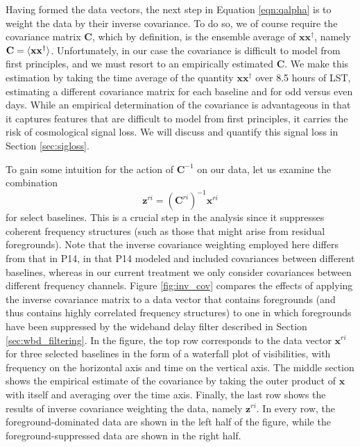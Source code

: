 \documentclass[twocolumn,numberedappendix]{emulateapj} \shorttitle{PSA64}
\newcommand{\x}{\mathbf{x}} \newcommand{\xhat}{\hat{\mathbf{x}}}
\begin{document}
Having formed the data vectors, the next step in Equation \eqref{eqn:qalpha} is to
weight the data by their inverse covariance. To do so, we of course require the covariance
matrix $\mathbf{C}$, which by definition, is the ensemble average of
$\x\x^\dagger$, namely $\mathbf{C} = \expval{\x\x^\dagger}$. Unfortunately, in our case the
covariance is difficult to model from first principles, and we must resort to an
empirically estimated $\mathbf{C}$. We make this estimation by taking the time average
of the quantity $\x\x^\dagger$ over 8.5 hours of LST, estimating a different covariance matrix
for each baseline and for odd versus even days. While an empirical determination of the covariance is advantageous
in that it captures features that are difficult to model from first principles, it
carries the risk of cosmological signal loss. We will discuss and quantify this signal loss
in Section \ref{sec:sigloss}.

To gain some intuition for the action of $\mathbf{C}^{-1}$ on our data, let us examine the
combination
\begin{equation}\label{eqn:z}
    \mathbf{z}^{ri} =  (\mathbf{C}^{ri})^{-1}\mathbf{x}^{ri}
\end{equation}
for select baselines. This is a crucial
step in the analysis since it suppresses coherent frequency structures (such as those
that might arise from residual foregrounds). Note that the inverse covariance weighting employed
here differs from that in P14, in that P14 modeled and included covariances between
different baselines, whereas in our current treatment we only consider covariances between
different frequency channels. 
Figure \ref{fig:inv_cov} compares the effects of applying
the inverse covariance matrix to a data vector that contains foregrounds (and thus contains
highly correlated frequency structures) to one in which foregrounds have been suppressed
by the wideband
delay filter described in Section \ref{sec:wbd_filtering}. In the figure, the
top row corresponds to the data vector $\mathbf{x}^{ri}$ for three selected baselines in the form
of a waterfall plot of
visibilities, with frequency on the horizontal axis and time on the vertical axis. The
middle section shows the empirical estimate of the covariance by taking the
outer product of $\x$ with itself and averaging over the time axis. Finally,
the last row shows the results of inverse covariance weighting the data,
namely $\mathbf{z}^{ri}$. In every row, the foreground-dominated data are shown
in the left half of the figure, while the foreground-suppressed data are shown in the right half.
\end{document}
